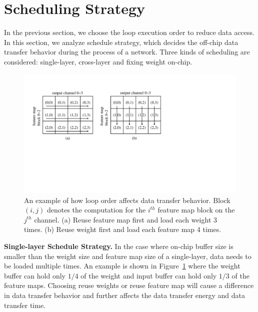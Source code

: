 \section{Scheduling Strategy}\label{sec:schedule}
In the previous section, we choose the loop execution order to reduce data access. In this section, we analyze schedule strategy, which decides the off-chip data transfer behavior during the process of a network. Three kinds of scheduling are considered: single-layer, cross-layer and fixing weight on-chip.

\begin{figure}[t]
  \centering
  \includegraphics[width=1\columnwidth]{fig/single_layer.pdf}
  \vspace{-20pt}
  \caption{An example of how loop order affects data transfer behavior. Block $(i, j)$ denotes the computation for the $i^{th}$ feature map block on the $j^{th}$ channel. (a) Reuse feature map first and load each weight 3 times. (b) Reuse weight first and load each feature map 4 times.}
  \label{fig:single_layer}
  \vspace{-5pt}
\end{figure}

{\bf{Single-layer Schedule Strategy}.} In the case where on-chip buffer size is smaller than the weight size and feature map size of a single-layer, data needs to be loaded multiple times. An example is shown in Figure~\ref{fig:single_layer} where the weight buffer can hold only $1/4$ of the weight and input buffer can hold only $1/3$ of the feature maps. Choosing reuse weights or reuse feature map will cause a difference in data transfer behavior and further affects the data transfer energy and data transfer time.

